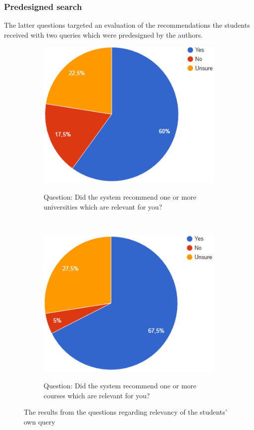 \subsubsection{Predesigned search}

The latter questions targeted an evaluation of the recommendations the students received with two queries which were predesigned by the authors.

\begin{figure}[h]
    \centering
    \begin{subfigure}[b]{0.40\textwidth}
        \caption{Question: Did the system recommend one or more universities which are relevant for you?}
        \includegraphics[width=\textwidth]{fig/results/predesigned_1.PNG}
        \label{fig:gull}
    \end{subfigure}
    ~ \qquad
    \begin{subfigure}[b]{0.40\textwidth}
        \caption{Question: Did the system recommend one or more courses which are relevant for you?}
        \includegraphics[width=\textwidth]{fig/results/predesigned_2.PNG}
        \label{fig:tiger}
    \end{subfigure}
    \caption{The results from the questions regarding relevancy of the students' own query}\label{fig:results_recommendation}
\end{figure}


